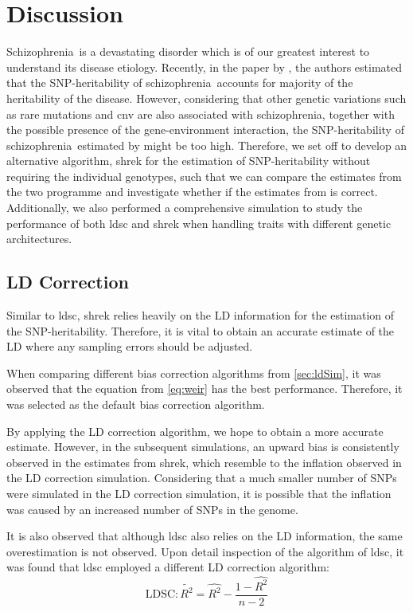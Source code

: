 \documentclass[12pt]{scrbook}
\newcommand*{\scz}{schizophrenia}
\newcommand*{\Scz}{Schizophrenia}
\begin{document}
\section{Discussion}
\Scz\ is a devastating disorder which is of our greatest interest to understand its disease etiology. 
Recently, in the paper by \citet{Bulik-Sullivan2015}, the authors estimated that the \gls{SNP}-heritability of \scz\ accounts for majority of the heritability of the disease.
However, considering that other genetic variations such as rare mutations and \gls{cnv} are also associated with \scz, together with the possible presence of the gene-environment interaction, the \gls{SNP}-heritability of \scz\ estimated by \citet{Bulik-Sullivan2015} might be too high.
Therefore, we set off to develop an alternative algorithm, \gls{shrek} for the estimation of \gls{SNP}-heritability without requiring the individual genotypes, such that we can compare the estimates from the two programme and investigate whether if the estimates from \citet{Bulik-Sullivan2015} is correct.
Additionally, we also performed a comprehensive simulation to study the performance of both \gls{ldsc} and \gls{shrek} when handling traits with different genetic architectures. 

\subsection{LD Correction}
Similar to \gls{ldsc}, \gls{shrek} relies heavily on the \gls{LD} information for the estimation of the \gls{SNP}-heritability. 
Therefore, it is vital to obtain an accurate estimate of the \gls{LD} where any sampling errors should be adjusted. 

When comparing different bias correction algorithms from \cref{sec:ldSim}, it was observed that the equation from \citet{Weir1980} \cref{eq:weir} has the best performance. 
Therefore, it was selected as the default bias correction algorithm.

By applying the \gls{LD} correction algorithm, we hope to obtain a more accurate estimate.
However, in the subsequent simulations, an upward bias is consistently observed in the estimates from \gls{shrek}, which resemble to the inflation observed in the \gls{LD} correction simulation. 
Considering that a much smaller number of \glspl{SNP} were simulated in the \gls{LD} correction simulation, it is possible that the inflation was caused by an increased number of \glspl{SNP} in the genome.

It is also observed that although \gls{ldsc} also relies on the \gls{LD} information, the same overestimation is not observed.
Upon detail inspection of the algorithm of \gls{ldsc}, it was found that \gls{ldsc} employed a different \gls{LD} correction algorithm:
\begin{equation}
\text{LDSC}: \tilde{R^2}= \hat{R^2}-\frac{1-\hat{R^2}}{n-2}\label{eq:ldscR2} 
\end{equation}
\end{document}
